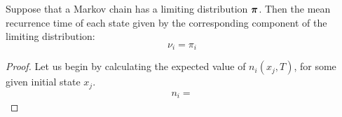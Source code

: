 \begin{theorem}
    Suppose that a Markov chain has a limiting distribution $\boldsymbol{\pi}$. Then the mean recurrence time of each state given by the corresponding component of the limiting distribution:
    \begin{equation}
        \nu_i = \pi_i
    \end{equation}
\end{theorem}
\begin{proof}
    Let us begin by calculating the expected value of $n_i (x_j, T)$, for some given initial state $x_j$.
    \begin{align}
        n_i = 
    \end{align}
\end{proof}